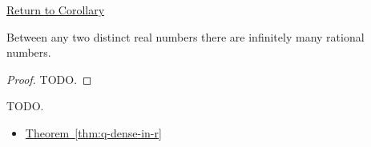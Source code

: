 \newpage
{}
\label{prf:infinitely-many-rationals-between}

\begin{remark*}[Return]
\hyperref[cor:infinitely-many-rationals-between]{Return to Corollary}
\end{remark*}

\begin{theorem*}
Between any two distinct real numbers there are infinitely many rational numbers.
\end{theorem*}

\begin{proof}
TODO.
\end{proof}

\begin{remark*}
TODO.
\end{remark*}

\begin{dependencies}
\begin{itemize}
  \item \hyperref[thm:q-dense-in-r]{Theorem~\ref*{thm:q-dense-in-r}}
\end{itemize}
\end{dependencies}

